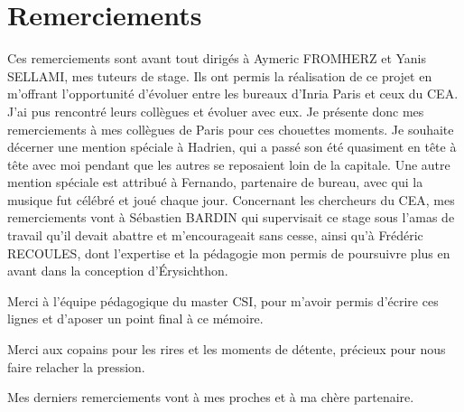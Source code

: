 \section*{Remerciements}


Ces remerciements sont avant tout dirigés à Aymeric FROMHERZ et Yanis SELLAMI, mes tuteurs de stage. Ils ont permis la réalisation de ce projet en m'offrant l'opportunité d'évoluer entre les bureaux d'Inria Paris et ceux du CEA. J'ai pus rencontré leurs collègues et évoluer avec eux. Je présente donc mes remerciements à mes collègues de Paris pour ces chouettes moments. Je souhaite décerner une mention spéciale à Hadrien, qui a passé son été quasiment en tête à tête avec moi pendant que les autres se reposaient loin de la capitale. Une autre mention spéciale est attribué à Fernando, partenaire de bureau, avec qui la musique fut célébré et joué chaque jour. Concernant les chercheurs du CEA, mes remerciements vont à Sébastien BARDIN qui supervisait ce stage sous l'amas de travail qu'il devait abattre et m'encourageait sans cesse, ainsi qu'à Frédéric RECOULES, dont l'expertise et la pédagogie mon permis de poursuivre plus en avant dans la conception d'Érysichthon.\smallbreak

Merci à l'équipe pédagogique du master CSI, pour m'avoir permis d'écrire ces lignes et d'aposer un point final à ce mémoire.\smallbreak

Merci aux copains pour les rires et les moments de détente, précieux pour nous faire relacher la pression.\smallbreak

Mes derniers remerciements vont à mes proches et à ma chère partenaire.

